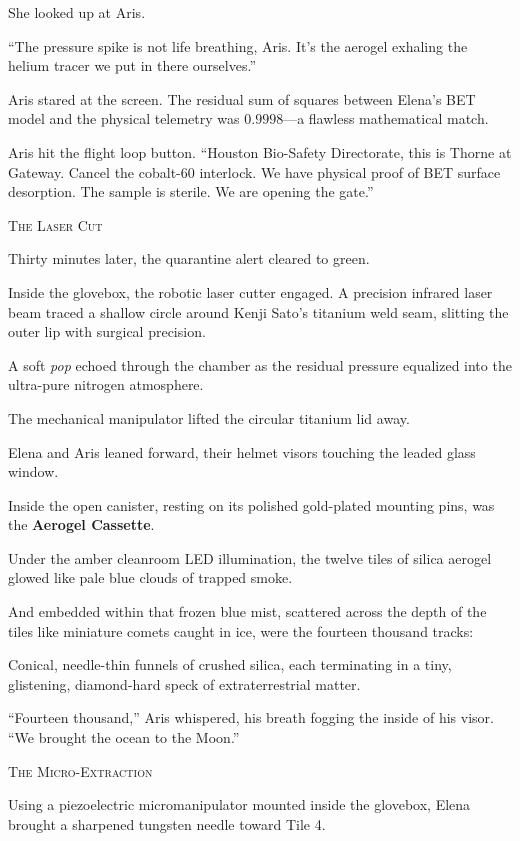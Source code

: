 \documentclass[12pt,twoside,openright]{book}
\newcommand{\sceneheader}[1]{%
  \par\vspace{1.8em}%
  {\noindent\centering\scshape\large #1\par}%
  \vspace{1.0em}%
  \noindent%
}
\newcommand{\dinkus}{%
  \par\vspace{1.2em}%
  {\noindent\centering{\large $\ast\quad\ast\quad\ast$}\par}%
  \vspace{1.2em}%
  \noindent%
}
\begin{document}
She looked up at Aris.

``The pressure spike is not life breathing, Aris. It's the aerogel
exhaling the helium tracer we put in there ourselves.''

Aris stared at the screen. The residual sum of squares between Elena's
BET model and the physical telemetry was \(0.9998\)---a flawless
mathematical match.

Aris hit the flight loop button. ``Houston Bio-Safety Directorate, this
is Thorne at Gateway. Cancel the cobalt-60 interlock. We have physical
proof of BET surface desorption. The sample is sterile. We are opening
the gate.''

\dinkus

\sceneheader{The Laser Cut}

Thirty minutes later, the quarantine alert cleared to green.

Inside the glovebox, the robotic laser cutter engaged. A precision
infrared laser beam traced a shallow circle around Kenji Sato's titanium
weld seam, slitting the outer lip with surgical precision.

A soft \emph{pop} echoed through the chamber as the residual pressure
equalized into the ultra-pure nitrogen atmosphere.

The mechanical manipulator lifted the circular titanium lid away.

Elena and Aris leaned forward, their helmet visors touching the leaded
glass window.

Inside the open canister, resting on its polished gold-plated mounting
pins, was the \textbf{Aerogel Cassette}.

Under the amber cleanroom LED illumination, the twelve tiles of silica
aerogel glowed like pale blue clouds of trapped smoke.

And embedded within that frozen blue mist, scattered across the depth of
the tiles like miniature comets caught in ice, were the fourteen
thousand tracks:

Conical, needle-thin funnels of crushed silica, each terminating in a
tiny, glistening, diamond-hard speck of extraterrestrial matter.

``Fourteen thousand,'' Aris whispered, his breath fogging the inside of
his visor. ``We brought the ocean to the Moon.''

\dinkus

\sceneheader{The Micro-Extraction}

Using a piezoelectric micromanipulator mounted inside the glovebox,
Elena brought a sharpened tungsten needle toward Tile 4.
\end{document}

